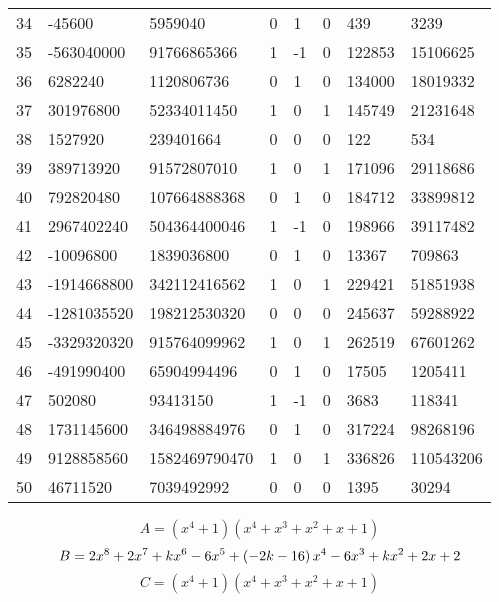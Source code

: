 \documentclass{amsart}
\begin{document}
\begin{longtable}{|l|l|l|lllll|}
34&-45600&5959040&0&1&0&439&3239\\
35&-563040000&91766865366&1&-1&0&122853&15106625\\
36&6282240&1120806736&0&1&0&134000&18019332\\
37&301976800&52334011450&1&0&1&145749&21231648\\
38&1527920&239401664&0&0&0&122&534\\
39&389713920&91572807010&1&0&1&171096&29118686\\
40&792820480&107664888368&0&1&0&184712&33899812\\
41&2967402240&504364400046&1&-1&0&198966&39117482\\
42&-10096800&1839036800&0&1&0&13367&709863\\
43&-1914668800&342112416562&1&0&1&229421&51851938\\
44&-1281035520&198212530320&0&0&0&245637&59288922\\
45&-3329320320&915764099962&1&0&1&262519&67601262\\
46&-491990400&65904994496&0&1&0&17505&1205411\\
47&502080&93413150&1&-1&0&3683&118341\\
48&1731145600&346498884976&0&1&0&317224&98268196\\
49&9128858560&1582469790470&1&0&1&336826&110543206\\
50&46711520&7039492992&0&0&0&1395&30294\\
\hline
\end{longtable}
$$A=(x^4
 + 1)(x^4
 + x^3
 + x^2
 + x
 + 1)$$
$$B=2\*x^8
 + 2\*x^7
 + k\*x^6
 - 6\*x^5
 + \left(-2\*k
 - 16\right) \*x^4
 - 6\*x^3
 + k\*x^2
 + 2\*x
 + 2$$
$$C=(x^4
 + 1)(x^4
 + x^3
 + x^2
 + x
 + 1)$$
\end{document}

